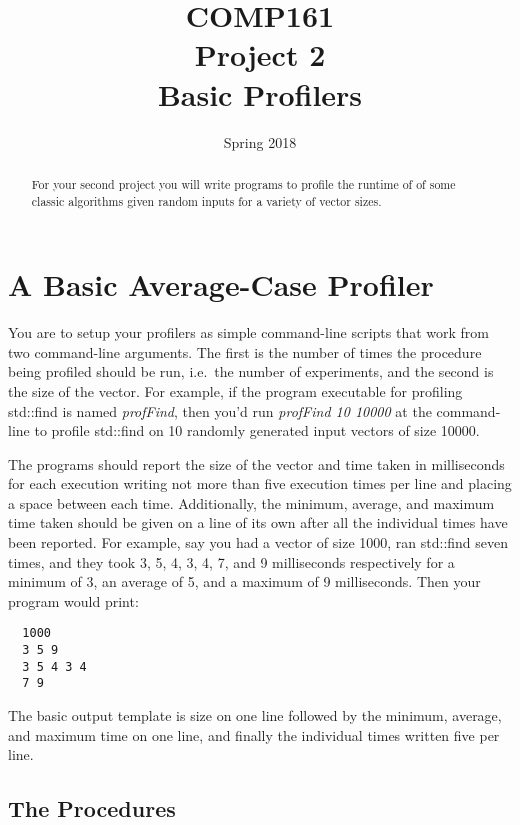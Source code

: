 \documentclass[nobib]{tufte-handout}
\title{COMP161 \\ Project 2 \\ Basic Profilers}
\author{}
\date{Spring 2018}
\begin{document}
\maketitle

\begin{abstract}
For your second project you will write programs to profile the runtime of of some classic algorithms given random inputs for a variety of vector sizes. \end{abstract}

\section{A Basic Average-Case Profiler}

You are to setup your profilers as simple command-line scripts that work from two command-line arguments. The first is the number of times the procedure being profiled should be run, i.e.\ the number of experiments, and the second is the size of the vector.  For example, if the program executable for profiling std::find is named  \textit{profFind}, then you'd run \textit{profFind 10 10000} at the command-line to profile std::find on 10 randomly generated input vectors of size 10000.

The programs should report the size of the vector and time taken in milliseconds for each execution writing not more than five execution times per line and placing a space between each time. Additionally, the minimum, average, and maximum time taken should be given on a line of its own after all the individual times have been reported. For example, say you had a vector of size 1000, ran std::find seven times, and they took 3, 5, 4, 3, 4, 7, and 9 milliseconds respectively for a minimum of 3, an average of 5, and a maximum of 9 milliseconds. Then your program would print:

\begin{verbatim}
  1000
  3 5 9
  3 5 4 3 4
  7 9

\end{verbatim}

The basic output template is size on one line followed by the minimum, average, and maximum time on one line, and finally the individual times written five per line.

\subsection{ The Procedures }
\end{document}
